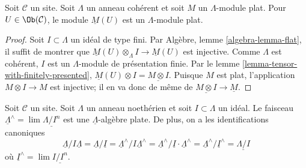 \begin{lemma}
\label{lemma-flat-sections}
Soit $\mathcal{C}$ un site. Soit $\Lambda$ un anneau cohérent et soit $M$ un
$\Lambda$-module plat. Pour $U \in \Ob(\mathcal{C})$, le module
$\underline{M}(U)$ est un $\Lambda$-module plat.
\end{lemma}

\begin{proof}
Soit $I \subset \Lambda$ un idéal de type fini. Par Algèbre,
lemme \ref{algebra-lemma-flat}, il suffit de montrer que
$\underline{M}(U) \otimes_\Lambda I \to \underline{M}(U)$
est injective. Comme $\Lambda$ est cohérent, $I$ est un $\Lambda$-module de
présentation finie. Par le lemme \ref{lemma-tensor-with-finitely-presented},
$\underline{M}(U) \otimes I = \underline{M \otimes I}$. Puisque $M$ est plat,
l'application $M \otimes I \to M$ est injective; il en va donc de même de
$\underline{M \otimes I} \to \underline{M}$.
\end{proof}

\begin{lemma}
\label{lemma-completion-flat}
Soit $\mathcal{C}$ un site. Soit $\Lambda$ un anneau noethérien et soit
$I \subset \Lambda$ un idéal. Le faisceau
$\underline{\Lambda}^\wedge = \lim \underline{\Lambda/I^n}$
est une $\underline{\Lambda}$-algèbre plate. De plus, on a les
identifications canoniques
$$
\underline{\Lambda}/I\underline{\Lambda} =
\underline{\Lambda}/\underline{I} =
\underline{\Lambda}^\wedge/I\underline{\Lambda}^\wedge =
\underline{\Lambda}^\wedge/\underline{I} \cdot \underline{\Lambda}^\wedge =
\underline{\Lambda}^\wedge/\underline{I}^\wedge =
\underline{\Lambda/I}
$$
où $\underline{I}^\wedge = \lim \underline{I/I^n}$.
\end{lemma}

